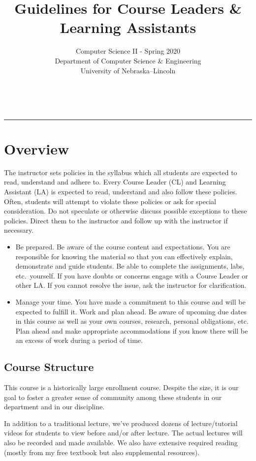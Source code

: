 \documentclass[12pt]{scrartcl}
\title{Guidelines for Course Leaders \& Learning Assistants}\let\Title\@title
\subtitle{Computer Science II - Spring 2020\\
{\small
\vskip1cm
Department of Computer Science \& Engineering \\
University of Nebraska--Lincoln}
\vskip-1cm}
\date{~}
\begin{document}
\maketitle


\hrule

\section*{Overview}

The instructor sets policies in the syllabus which all students 
are expected to read, understand and adhere to. Every Course Leader
(CL) and Learning Assistant (LA) is expected to read, understand 
and also follow these policies.  Often, students will attempt to 
violate these policies or ask for special consideration.  Do not 
speculate or otherwise discuss possible exceptions to these policies.  
Direct them to the instructor and follow up with the instructor if 
necessary.

\begin{itemize}
  \item Be prepared.  Be aware of the course content and expectations.
  You are responsible for knowing the material so that you can effectively
  explain, demonstrate and guide students.  Be able to complete the assignments, 
  labs, etc.\ yourself.  If you have doubts or concerns engage with
  a Course Leader or other LA.  If you cannot resolve the issue, ask the 
  instructor for clarification.
  \item Manage your time.  You have made a commitment to this course and
  will be expected to fulfill it.  Work and plan ahead.  Be aware of 
  upcoming due dates in this course as well as your own courses, research, 
  personal obligations, etc.  Plan ahead and make appropriate accommodations 
  if you know there will be an excess of work during a period of time.
\end{itemize}

\subsection*{Course Structure}

This course is a historically large enrollment course.  
Despite the size, it is our goal to foster a greater sense of 
community among these students in our department and in our 
discipline.  

In addition to a traditional lecture, we've produced dozens of 
lecture/tutorial videos for students to view before and/or after lecture. 
The actual lectures will also be recorded and made available.
We also have extensive required reading (mostly from my free textbook but 
also supplemental resources).  
\end{document}
